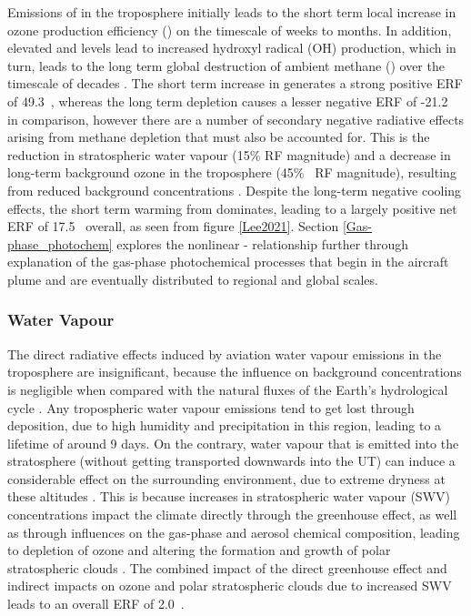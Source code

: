 Emissions of  in the troposphere initially leads to the short term local increase in ozone production efficiency () on the timescale of weeks to months. In addition, elevated  and  levels lead to increased hydroxyl radical (OH) production, which in turn, leads to the long term global destruction of ambient methane () over the timescale of decades \cite{Stevenson2004, Wild2001, Myhre2011}. The short term increase in  generates a strong positive ERF of 49.3~, whereas the long term  depletion causes a lesser negative ERF of -21.2~ in comparison, however there are a number of secondary negative radiative effects arising from methane depletion that must also be accounted for. This is the reduction in stratospheric water vapour (15\%  RF magnitude) and a decrease in long-term background ozone in the troposphere (45\%~ RF magnitude), resulting from reduced background  concentrations \cite{Holmes2011, Myhre2007}. Despite the long-term negative cooling effects, the short term warming from  dominates, leading to a largely positive net ERF of 17.5~ overall, as seen from figure \ref{Lee2021}. Section \ref{Gas-phase_photochem} explores the nonlinear - relationship further through explanation of the gas-phase photochemical processes that begin in the aircraft plume and are eventually distributed to regional and global scales. 

\subsubsection{Water Vapour}
The direct radiative effects induced by aviation water vapour emissions in the troposphere are insignificant, because the influence on background concentrations is negligible when compared with the natural fluxes of the Earth's hydrological cycle \cite{IPCC1999}. Any tropospheric water vapour emissions tend to get lost through deposition, due to high humidity and precipitation in this region, leading to a lifetime of around 9 days. On the contrary, water vapour that is emitted into the stratosphere (without getting transported downwards into the UT) can induce a considerable effect on the surrounding environment, due to extreme dryness at these altitudes \cite{Jensen1996}. This is because increases in stratospheric water vapour (SWV) concentrations impact the climate directly through the greenhouse effect, as well as through influences on the gas-phase and aerosol chemical composition, leading to depletion of ozone and altering the formation and growth of polar stratospheric clouds \cite{Stenke2005}. The combined impact of the direct greenhouse effect and indirect impacts on ozone and polar stratospheric clouds due to increased SWV leads to an overall ERF of 2.0~.

